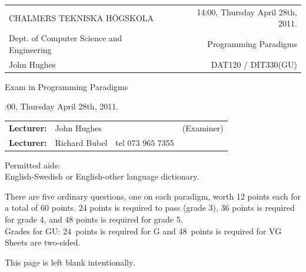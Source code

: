 \documentclass{article}
\begin{document}
\newcommand{\examtime}{14:00, Thursday April 28th, 2011}
\newcommand{\points}[1]{\marginpar{\bf #1 points}}
\noindent
\begin{tabular}{lr}
CHALMERS TEKNISKA H\"OGSKOLA &\examtime{}.\\
Dept. of Computer Science and Engineering & Programming Paradigms\\
John Hughes                  & DAT120 / DIT330(GU) \\
\end{tabular}

\vspace{2.5cm} \noindent
\begin{center} {\LARGE
Exam in Programming Paradigms}
\end{center}

\vspace{1.5cm}

\noindent
\examtime{}.\\
\begin{tabular}{lllc}
\textbf{Lecturer:} &  John Hughes  & & (Examiner)\\
\textbf{Lecturer:} & Richard Bubel & tel 073 965 7355 & \\ 
\end{tabular}
\vspace{1cm}

\noindent
Permitted aids:\\
English-Swedish or English-other language dictionary.

There are five ordinary questions, one on each paradigm, worth 12
points each for a total of 60 points. 24 points is required to pass
(grade 3), 36 points is required for grade 4, and 48 points is
required for grade 5.\\
Grades for GU: 24~points is required for G and 48~points is required
for VG\\

Sheets are two-sided.

\newcommand{\comment}[1]{\marginpar{#1}}

\newpage
This page is left blank intentionally.
\hfill
\newpage
\end{document}

